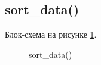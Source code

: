 \subsection{sort\_data()}

Блок-схема на рисунке \ref{fig:sort_data}.

\begin{figure}[p]
    \caption{sort\_data()}
    \label{fig:sort_data}
\end{figure}





\newpage